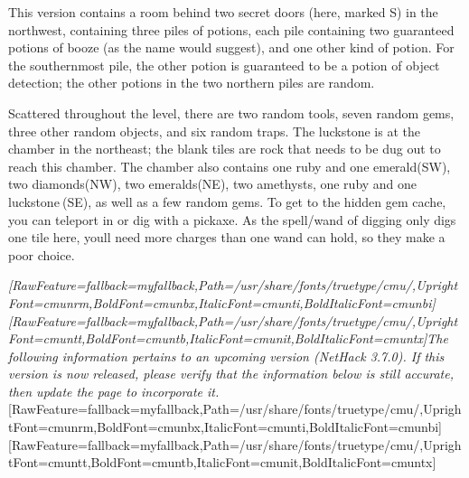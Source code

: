 This version contains a room behind two secret doors (here, marked S) in the northwest, containing three piles of potions, each pile containing two guaranteed potions of booze\footnotemark[63] (as the name would suggest), and one other kind of potion. For the southernmost pile, the other potion is guaranteed to be a potion of object detection\footnotemark[64]; the other potions in the two northern piles are random.

Scattered throughout the level, there are two random tools, seven random gems, three other random objects, and six random traps. The luckstone\footnotemark[65] is at the chamber in the northeast; the blank tiles are rock that needs to be dug out to reach this chamber. The chamber also contains one ruby\footnotemark[66] and one emerald\footnotemark[67](SW), two diamonds\footnotemark[68](NW), two emeralds\footnotemark[69](NE), two amethysts\footnotemark[70], one ruby\footnotemark[71] and one luckstone{\mbox{$~$}}(SE), as well as a few random gems. To get to the hidden gem cache, you can teleport in or dig with a pickaxe. As the spell/wand of digging only digs one tile here, you\textquotesingle{}ll need more charges than one wand can hold, so they make a poor choice.

{\itshape \allowbreak{}\setmainfont{cmunti.ttf}[RawFeature={fallback=myfallback},Path=/usr/share/fonts/truetype/cmu/,UprightFont=cmunrm,BoldFont=cmunbx,ItalicFont=cmunti,BoldItalicFont=cmunbi]\setmonofont{cmunti.ttf}[RawFeature={fallback=myfallback},Path=/usr/share/fonts/truetype/cmu/,UprightFont=cmuntt,BoldFont=cmuntb,ItalicFont=cmunit,BoldItalicFont=cmuntx]\itshape The following information pertains to an upcoming version (NetHack 3.7.0\footnotemark[72]). If this version is now released, please verify that the information below is still accurate, then update the page to incorporate it.}\allowbreak{}\setmainfont{cmunrm.ttf}[RawFeature={fallback=myfallback},Path=/usr/share/fonts/truetype/cmu/,UprightFont=cmunrm,BoldFont=cmunbx,ItalicFont=cmunti,BoldItalicFont=cmunbi]\setmonofont{cmunrm.ttf}[RawFeature={fallback=myfallback},Path=/usr/share/fonts/truetype/cmu/,UprightFont=cmuntt,BoldFont=cmuntb,ItalicFont=cmunit,BoldItalicFont=cmuntx]

